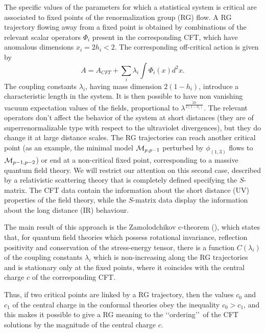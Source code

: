 \documentclass[a4paper,12pt]{report}
\begin{document}
The specific values of the parameters for which a statistical system is critical are associated to fixed points of
the renormalization group (RG) flow. A RG trajectory flowing away from a fixed point is obtained by combinations
of the relevant scalar operators $\Phi _{i}$ present in the corresponding CFT, which have anomalous dimensions
$x_{i}=2 h _{i}< 2$. The corresponding off-critical action is given by
\begin{equation}\label{action}
A=A_{CFT}+\sum _{i}\lambda _{i}\int\Phi _{i}(x)d^{2}x.
\end{equation}
The coupling constants $ \lambda _{i}$, having mass dimension $ 2\left(1-h _{i} \right)$, introduce a
characteristic length in the system. It is then possible to have non vanishing vacuum expectation values of the
fields, proportional to $ \lambda ^{\frac{2h }{2\left(1-h _{i} \right)}}$. The relevant operators don't affect
the behavior of the system at short distances (they are of superrenormalizable type with respect to the
ultraviolet divergences), but they do change it at large distance scales. The RG trajectories can reach another
critical point (as an example, the minimal model ${\cal M}_{p,p-1}$ perturbed by $\phi _{(1,3)}$ flows to ${\cal
M}_{p-1,p-2}$) or end at a non-critical fixed point, corresponding to a massive quantum field theory. We will
restrict our attention on this second case, described by a relativistic scattering theory that is completely
defined specifying the $S$-matrix. The CFT data contain the information about the short distance (UV) properties
of the field theory, while the $S$-matrix data display the information about the long distance (IR) behaviour.

The main result of this approach is the Zamolodchikov c-theorem (\cite{zamcth}), which states that, for quantum
field theories which possess rotational invariance, reflection positivity and conservation of the stress-energy
tensor, there is a function $C\left(\lambda _{i} \right)$ of the coupling constants $\lambda _{i}$ which is
non-increasing along the RG trajectories and is stationary only at the fixed points, where it coincides with the
central charge $c$ of the corresponding CFT.

Thus, if two critical points are linked by a RG trajectory, then the values $c_{0}$ and $c_{1}$ of the central
charge in the conformal theories obey the inequality $c_{0}> c_{1}$, and this makes it possible to give a RG
meaning to the \lq\lq ordering\rq\rq\, of the CFT solutions by the magnitude of the central charge $c$.
\end{document}
